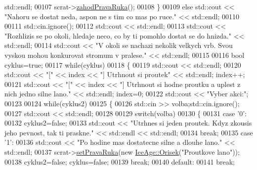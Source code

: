 \begin{DoxyCode}
      std::endl;
00107         scrat->\hyperlink{classIceAge_1_1ObleceneVybaveniVeverky_ac24580a8bfcf97220c1967f58111c8f1}{zahodPravaRuka}();
00108     \}
00109     \textcolor{keywordflow}{else} std::cout << \textcolor{stringliteral}{"Nahoru se dostat neda, aspon ne s tim co mas po ruce."} << std::endl;
00110 
00111     std::cin.ignore();
00112     std::cout << std::endl;
00113     std::cout << \textcolor{stringliteral}{"Rozhlizis se po okoli, hledaje neco, co by ti pomohlo dostat se do hnizda."} << std::endl;
00114     std::cout << \textcolor{stringliteral}{"V okoli se nachazi nekolik velkych vrb. Svou vyskou mohou konkurovat stromum v pralese."} 
      << std::endl;
00115 
00116     \textcolor{keywordtype}{bool} cyklus=\textcolor{keyword}{true};
00117     \textcolor{keywordflow}{while}(cyklus)
00118     \{
00119         std::cout << std::endl;
00120         std::cout << \textcolor{stringliteral}{"["} << index << \textcolor{stringliteral}{"] Utrhnout si proutek"} << std::endl; index++;
00121         std::cout << \textcolor{stringliteral}{"["} << index << \textcolor{stringliteral}{"] Utrhnout si hodne proutku a uplest z nich jedno silne lano."} << 
      std::endl; index=0;
00122         std::cout << \textcolor{stringliteral}{"Vyber akci:"};
00123 
00124         \textcolor{keywordflow}{while}(cyklus2)
00125         \{
00126             std::cin >> volba;std::cin.ignore();
00127             std::cout << std::endl;
00128 
00129             \textcolor{keywordflow}{switch}(volba)
00130             \{
00131                 \textcolor{keywordflow}{case} \textcolor{charliteral}{'0'}:
00132                     cyklus2=\textcolor{keyword}{false};
00133                     std::cout << \textcolor{stringliteral}{"Utrhnes si jeden proutek. Kdyz zkousis jeho pevnost, tak ti praskne."} << 
      std::endl << std::endl;
00134                     \textcolor{keywordflow}{break};
00135                 \textcolor{keywordflow}{case} \textcolor{charliteral}{'1'}:
00136                     std::cout << \textcolor{stringliteral}{"Po hodine mas dostatecne silne a dlouhe lano."} << std::endl;
00137                     scrat->\hyperlink{classIceAge_1_1ObleceneVybaveniVeverky_a81c50b90cae451476735b88f3cdecb07}{setPravaRuka}(\textcolor{keyword}{new} \hyperlink{classIceAge_1_1Orisek}{IceAge::Orisek}(\textcolor{stringliteral}{"Proutkove lano"}));
00138                     cyklus2=\textcolor{keyword}{false}; cyklus=\textcolor{keyword}{false};
00139                     \textcolor{keywordflow}{break};
00140                 \textcolor{keywordflow}{default}:
00141                     \textcolor{keywordflow}{break};

\end{DoxyCode}
